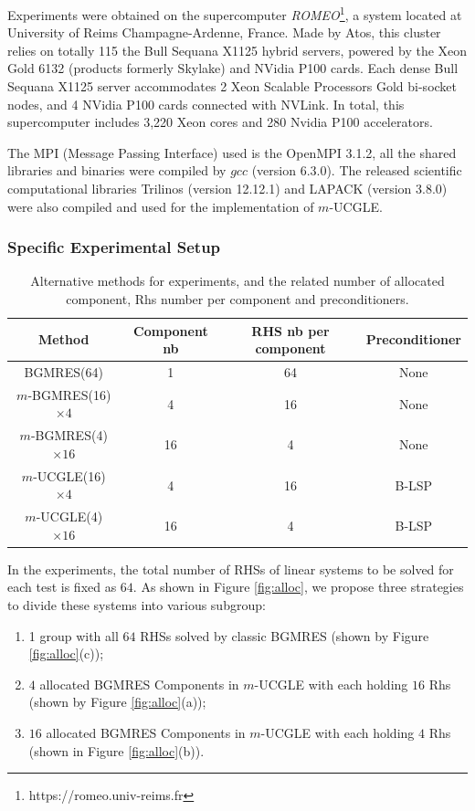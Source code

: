 Experiments were obtained on the supercomputer \textit{ROMEO}\footnote{https://romeo.univ-reims.fr}, a system located at University of Reims Champagne-Ardenne, France. Made by Atos, this cluster relies on totally 115 the Bull Sequana X1125 hybrid servers, powered by the Xeon Gold 6132 (products formerly Skylake) and NVidia P100 cards. Each dense Bull Sequana X1125 server accommodates 2 Xeon Scalable Processors Gold bi-socket nodes, and 4 NVidia P100 cards connected with NVLink. In total, this supercomputer includes 3,220 Xeon cores and 280 Nvidia P100 accelerators.

The MPI (Message Passing Interface) used is the OpenMPI 3.1.2, all the shared libraries and binaries were compiled by $gcc$ (version 6.3.0). The released scientific computational libraries Trilinos (version 12.12.1) and LAPACK (version 3.8.0) were also compiled and used for the implementation of $m$-UCGLE. 

\subsubsection{Specific Experimental Setup}

\begin{table}[htbp]
	\renewcommand{\arraystretch}{1.4}
	\small	
	\caption{Alternative methods for experiments, and the related number of allocated component, Rhs number per component and preconditioners.}
	\label{allocname}
	\centering
	\begin{tabular}{c|c|c|c}
		\toprule
		Method & Component nb & RHS nb per component & Preconditioner  \\
		\midrule
		BGMRES(64)  &1& 64 & None\\
		$m$-BGMRES(16)$\times 4$ &4 & 16 & None  \\
		$m$-BGMRES(4)$\times 16$ & 16 & 4 & None   \\
		$m$-UCGLE(16)$\times 4$ & 4 & 16 & B-LSP   \\
		$m$-UCGLE(4)$\times 16$ & 16 & 4 & B-LSP  \\
		\bottomrule
	\end{tabular}
	\label{name}
\end{table}

In the experiments, the total number of RHSs of linear systems to be solved for each test is fixed as $64$. As shown in Figure \ref{fig:alloc}, we propose three strategies to divide these systems into various subgroup: 

\begin{enumerate}
	\item 1 group with all $64$ RHSs solved by classic BGMRES (shown by Figure \ref{fig:alloc}(c));
	\item  $4$ allocated BGMRES Components in $m$-UCGLE with each holding $16$ Rhs (shown by Figure \ref{fig:alloc}(a));
	\item $16$ allocated BGMRES Components in $m$-UCGLE with each holding $4$ Rhs (shown in Figure \ref{fig:alloc}(b)).
\end{enumerate}

